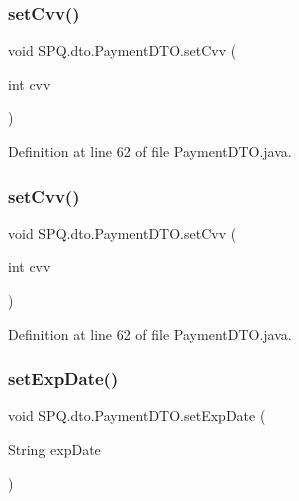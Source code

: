 \subsubsection{\texorpdfstring{set\+Cvv()}{setCvv()}\hspace{0.1cm}{\footnotesize\ttfamily [2/3]}}
{\footnotesize\ttfamily void S\+P\+Q.\+dto.\+Payment\+D\+T\+O.\+set\+Cvv (\begin{DoxyParamCaption}\item[{int}]{cvv }\end{DoxyParamCaption})}



Definition at line 62 of file Payment\+D\+T\+O.\+java.

\mbox{\label{class_s_p_q_1_1dto_1_1_payment_d_t_o_aee98ca86c3d7e05f98e387faa4f5a3d4}} 
\subsubsection{\texorpdfstring{set\+Cvv()}{setCvv()}\hspace{0.1cm}{\footnotesize\ttfamily [3/3]}}
{\footnotesize\ttfamily void S\+P\+Q.\+dto.\+Payment\+D\+T\+O.\+set\+Cvv (\begin{DoxyParamCaption}\item[{int}]{cvv }\end{DoxyParamCaption})}



Definition at line 62 of file Payment\+D\+T\+O.\+java.

\mbox{\label{class_s_p_q_1_1dto_1_1_payment_d_t_o_a6d3d88f07321648bc17e385432ee9044}} 
\subsubsection{\texorpdfstring{set\+Exp\+Date()}{setExpDate()}\hspace{0.1cm}{\footnotesize\ttfamily [1/3]}}
{\footnotesize\ttfamily void S\+P\+Q.\+dto.\+Payment\+D\+T\+O.\+set\+Exp\+Date (\begin{DoxyParamCaption}\item[{String}]{exp\+Date }\end{DoxyParamCaption})}



